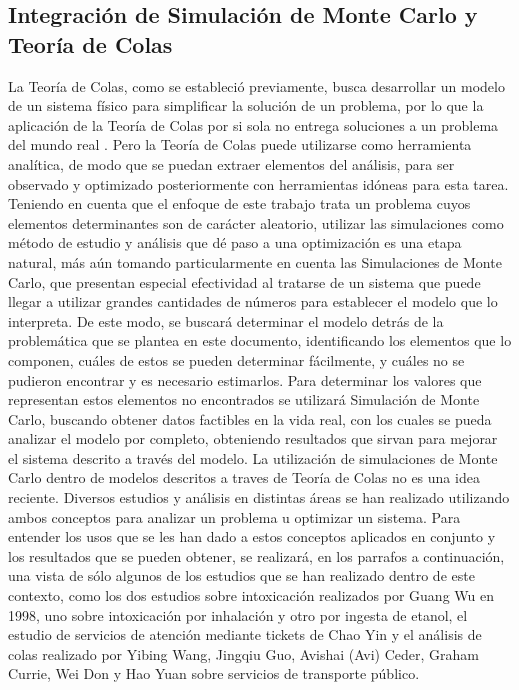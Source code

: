 \subsection{Integración de Simulación de Monte Carlo y Teoría de Colas} %
\noindent La Teoría de Colas, como se estableció previamente, busca desarrollar un modelo de un sistema físico para simplificar la solución de un problema, por lo que la aplicación de la Teoría de Colas por si sola no entrega soluciones a un problema del mundo real \citep{terrazas2010}. Pero la Teoría de Colas puede utilizarse como herramienta analítica, de modo que se puedan extraer elementos del análisis, para ser observado y optimizado posteriormente con herramientas idóneas para esta tarea.
\newline \newline
Teniendo en cuenta que el enfoque de este trabajo trata un problema cuyos elementos determinantes son de carácter aleatorio, utilizar las simulaciones como método de estudio y análisis que dé paso a una optimización es una etapa natural, más aún tomando particularmente en cuenta las Simulaciones de Monte Carlo, que presentan especial efectividad al tratarse de un sistema que puede llegar a utilizar grandes cantidades de números para establecer el modelo que lo interpreta.
\newline \newline
De este modo, se buscará determinar el modelo detrás de la problemática que se plantea en este documento, identificando los elementos que lo componen, cuáles de estos se pueden determinar fácilmente, y cuáles no se pudieron encontrar y es necesario estimarlos. Para determinar los valores que representan estos elementos no encontrados se utilizará Simulación de Monte Carlo, buscando obtener datos factibles en la vida real, con los cuales se pueda analizar el modelo por completo, obteniendo resultados que sirvan para mejorar el sistema descrito a través del modelo.
\newline \newline
La utilización de simulaciones de Monte Carlo dentro de modelos descritos a traves de Teoría de Colas no es una idea reciente. Diversos estudios y análisis en distintas áreas se han realizado utilizando ambos conceptos para analizar un problema u optimizar un sistema. Para entender los usos que se les han dado a estos conceptos aplicados en conjunto y los resultados que se pueden obtener, se realizará, en los parrafos a continuación, una vista de sólo algunos de los estudios que se han realizado dentro de este contexto, como los dos estudios sobre intoxicación realizados por Guang Wu en 1998, uno sobre intoxicación por inhalación y otro por ingesta de etanol, el estudio de servicios de atención mediante tickets de Chao Yin y el análisis de colas realizado por Yibing Wang, Jingqiu Guo, Avishai (Avi) Ceder, Graham Currie, Wei Don y Hao Yuan sobre servicios de transporte público.

